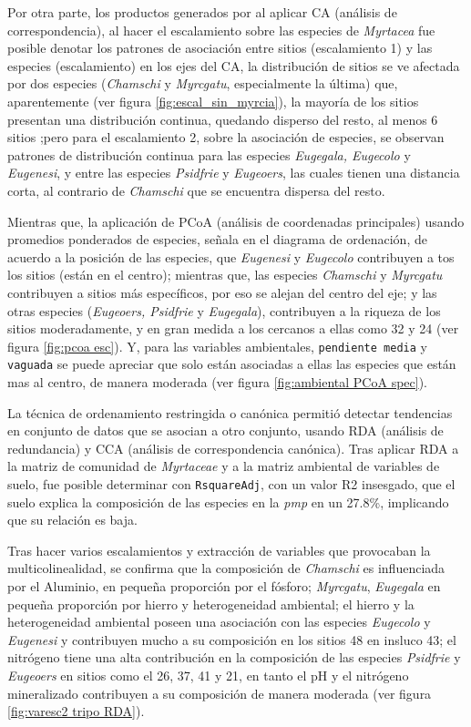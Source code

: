\documentclass[11pt,]{article}
\begin{document}
Por otra parte, los productos generados por al aplicar CA (análisis de
correspondencia), al hacer el escalamiento sobre las especies de
\emph{Myrtacea} fue posible denotar los patrones de asociación entre
sitios (escalamiento 1) y las especies (escalamiento) en los ejes del
CA, la distribución de sitios se ve afectada por dos especies
(\emph{Chamschi} y \emph{Myrcgatu}, especialmente la última) que,
aparentemente (ver figura \ref{fig:escal_sin_myrcia}), la mayoría de los
sitios presentan una distribución continua, quedando disperso del resto,
al menos 6 sitios ;pero para el escalamiento 2, sobre la asociación de
especies, se observan patrones de distribución continua para las
especies \emph{Eugegala, Eugecolo} y \emph{Eugenesi}, y entre las
especies \emph{Psidfrie} y \emph{Eugeoers}, las cuales tienen una
distancia corta, al contrario de \emph{Chamschi} que se encuentra
dispersa del resto.

Mientras que, la aplicación de PCoA (análisis de coordenadas
principales) usando promedios ponderados de especies, señala en el
diagrama de ordenación, de acuerdo a la posición de las especies, que
\emph{Eugenesi} y \emph{Eugecolo} contribuyen a tos los sitios (están en
el centro); mientras que, las especies \emph{Chamschi} y \emph{Myrcgatu}
contribuyen a sitios más específicos, por eso se alejan del centro del
eje; y las otras especies (\emph{Eugeoers, Psidfrie} y \emph{Eugegala}),
contribuyen a la riqueza de los sitios moderadamente, y en gran medida a
los cercanos a ellas como 32 y 24 (ver figura \ref{fig:pcoa esc}). Y,
para las variables ambientales, \texttt{pendiente\ media} y
\texttt{vaguada} se puede apreciar que solo están asociadas a ellas las
especies que están mas al centro, de manera moderada (ver figura
\ref{fig:ambiental PCoA spec}).

La técnica de ordenamiento restringida o canónica permitió detectar
tendencias en conjunto de datos que se asocian a otro conjunto, usando
RDA (análisis de redundancia) y CCA (análisis de correspondencia
canónica). Tras aplicar RDA a la matriz de comunidad de \emph{Myrtaceae}
y a la matriz ambiental de variables de suelo, fue posible determinar
con \texttt{RsquareAdj}, con un valor R2 insesgado, que el suelo explica
la composición de las especies en la \emph{pmp} en un 27.8\%, implicando
que su relación es baja.

Tras hacer varios escalamientos y extracción de variables que provocaban
la multicolinealidad, se confirma que la composición de \emph{Chamschi}
es influenciada por el Aluminio, en pequeña proporción por el fósforo;
\emph{Myrcgatu}, \emph{Eugegala} en pequeña proporción por hierro y
heterogeneidad ambiental; el hierro y la heterogeneidad ambiental poseen
una asociación con las especies \emph{Eugecolo} y \emph{Eugenesi} y
contribuyen mucho a su composición en los sitios 48 en insluco 43; el
nitrógeno tiene una alta contribución en la composición de las especies
\emph{Psidfrie} y \emph{Eugeoers} en sitios como el 26, 37, 41 y 21, en
tanto el pH y el nitrógeno mineralizado contribuyen a su composición de
manera moderada (ver figura \ref{fig:varesc2 tripo RDA}).
\end{document}
